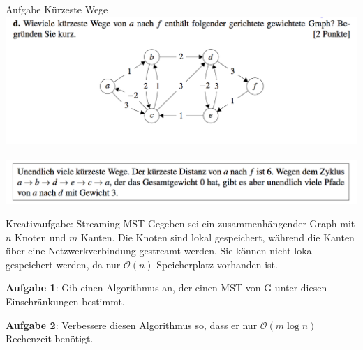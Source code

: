 \begin{frame}{Aufgabe Kürzeste Wege}
	\includegraphics[width=\textwidth]{images/shortestPath01}
	\ \\
	\includegraphics[width=\textwidth]{images/shortestPath02}
\end{frame}


\begin{frame}{Kreativaufgabe: Streaming MST}
	Gegeben sei ein zusammenhängender Graph mit $n$ Knoten und $m$ Kanten.
	Die Knoten sind lokal gespeichert, während die Kanten über eine Netzwerkverbindung gestreamt werden.
	Sie können nicht lokal gespeichert werden, da nur $\mathcal{O}(n)$ Speicherplatz vorhanden ist.

	\textbf{Aufgabe 1}: Gib einen Algorithmus an, der einen MST von G unter diesen Einschränkungen bestimmt.

	\textbf{Aufgabe 2}: Verbessere diesen Algorithmus so, dass er nur $\mathcal{O}(m \log{n})$ Rechenzeit benötigt.
\end{frame}


